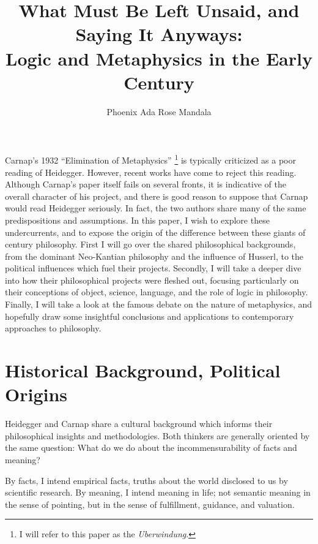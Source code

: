 \documentclass[leqno, 12pt]{turabian-researchpaper}
\title{What Must Be Left Unsaid, and Saying It Anyways: \\ Logic and Metaphysics
in the Early \nth{20} Century}
\author{Phoenix Ada Rose Mandala}
\begin{document}
	\maketitle

	Carnap's 1932 \enquote{Elimination of Metaphysics} \nocite{carnap1966}\footnote{I
	will refer to this paper as the \textit{Uberwindung}.} is typically criticized
	as a poor reading of Heidegger. However, recent works have come to reject this
	reading. Although Carnap's paper itself fails on several fronts, it is indicative
	of the overall character of his project, and there is good reason to suppose
	that Carnap would read Heidegger seriously. In fact, the two authors share
	many of the same predispositions and assumptions. In this paper, I wish to
	explore these undercurrents, and to expose the origin of the difference between
	these giants of  century philosophy. First I will go over the shared philosophical
	backgrounds, from the dominant Neo-Kantian philosophy and the influence of
	Husserl, to the political influences which fuel their projects. Secondly, I will
	take a deeper dive into how their philosophical projects were fleshed out,
	focusing particularly on their conceptions of object, science, language, and the
	role of logic in philosophy. Finally, I will take a look at the famous debate on
	the nature of metaphysics, and hopefully draw some insightful conclusions and
	applications to contemporary approaches to philosophy.

	\section{Historical Background, Political Origins}

	Heidegger and Carnap share a cultural background which informs their philosophical
	insights and methodologies. Both thinkers are generally oriented by the same
	question: What do we do about the incommensurability of facts and meaning?

	By facts, I intend empirical facts, truths about the world disclosed to us by scientific
	research. By meaning, I intend meaning in life; not semantic meaning in the
	sense of pointing, but in the sense of fulfillment, guidance, and valuation.
\end{document}
